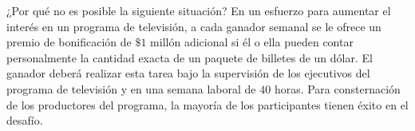 \item ¿Por qué no es posible la siguiente situación? En un esfuerzo para aumentar el interés en un programa de televisión, a cada ganador semanal se le ofrece un premio de bonificación de $\$1$ millón adicional si él o ella pueden contar personalmente la cantidad exacta de un paquete de billetes de un dólar. El ganador deberá realizar esta tarea bajo la supervisión de los ejecutivos del programa de televisión y en una semana laboral de $40$ horas. Para consternación de los productores del programa, la mayoría de los participantes tienen éxito en el desafío.
